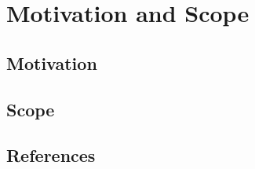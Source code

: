 



\section{Motivation and Scope}

\subsection{Motivation}



\subsection{Scope}
\label{sec:scope}



\subsection{References}





